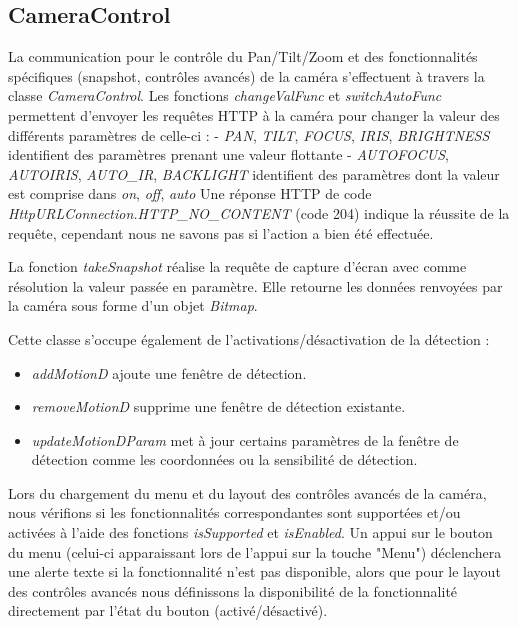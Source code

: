 \subsection{CameraControl}
La communication pour le contrôle du Pan/Tilt/Zoom et des fonctionnalités spécifiques (snapshot, contrôles avancés) de la caméra s'effectuent à travers la classe \textit{CameraControl}.
Les fonctions \textit{changeValFunc} et \textit{switchAutoFunc} permettent d'envoyer les requêtes HTTP à la caméra pour changer la valeur des différents paramètres de celle-ci :
- \textit{PAN}, \textit{TILT}, \textit{FOCUS}, \textit{IRIS}, \textit{BRIGHTNESS} identifient des paramètres prenant une valeur flottante
- \textit{AUTOFOCUS}, \textit{AUTOIRIS}, \textit{AUTO\_IR}, \textit{BACKLIGHT}
identifient des paramètres dont la valeur est comprise dans { \textit{on}, \textit{off}, \textit{auto} } Une réponse HTTP de code \textit{HttpURLConnection.HTTP\_NO\_CONTENT} (code 204)
indique la réussite de la requête, cependant nous ne savons pas si l'action a bien été effectuée.

La fonction \textit{takeSnapshot} réalise la requête de capture d'écran avec comme résolution la valeur passée en paramètre.
Elle retourne les données renvoyées par la caméra sous forme d'un objet \textit{Bitmap}.

Cette classe s'occupe également de l'activations/désactivation de la détection :
\begin{itemize}
	\item \textit{addMotionD} ajoute une fenêtre de détection.
	\item \textit{removeMotionD} supprime une fenêtre de détection existante.
	\item \textit{updateMotionDParam} met à jour certains paramètres de la fenêtre
	de détection comme les coordonnées ou la sensibilité de détection.
\end{itemize}

Lors du chargement du menu et du layout des contrôles avancés de la caméra, nous vérifions si les fonctionnalités correspondantes sont supportées et/ou activées à l'aide des fonctions
\textit{isSupported} et \textit{isEnabled}. Un appui sur le bouton du menu (celui-ci apparaissant lors de l'appui sur la touche "Menu") déclenchera une alerte texte si la fonctionnalité n'est pas
disponible, alors que pour le layout des contrôles avancés nous définissons la disponibilité de la fonctionnalité directement par l'état du bouton (activé/désactivé).

